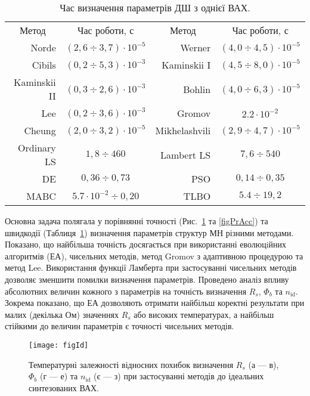 \documentclass[a5paper,10pt,twoside,openany,article]{memoir} %
\begin{document}
\begin{table}[b]
\caption{\label{tabRT}Час визначення параметрів ДШ з однієї ВАХ.}
\centering
\begin{tabular}{|r|c|r|c|}
\hline
\multicolumn{1}{|c|}{Метод}&Час роботи, с &\multicolumn{1}{c|}{Метод}&Час роботи, с\\ \hhline{|====|}
Norde &$(2,6\div3,7)\cdot10^{-5}$& Werner  &$(4,0\div4,5)\cdot10^{-5}$\\ \hline
Cibils  &$(0,2\div5,3)\cdot10^{-3}$& Kaminskii I &$(4,5\div8,0)\cdot10^{-5}$\\ \hline
Kaminskii II &$(0,3\div2,6)\cdot10^{-3}$& Bohlin &$(4,0\div6,3)\cdot10^{-5}$\\ \hline
Lee &$(0,2\div3,6)\cdot10^{-3}$& Gromov &$2.2\cdot10^{-2}$\\ \hline
Cheung &$(2,0\div3,2)\cdot10^{-5}$&Mikhelashvili &$(2,9\div4,7)\cdot10^{-5}$\\ \hline
Ordinary LS &$1,8\div460$&Lambert LS &$7,6\div540$\\ \hline
DE &$0,36\div0,73$&PSO &$0,14\div0,35$\\ \hline
MABC &$5.7\cdot10^{-2}\div0,20$&TLBO &$5.4\div19,2$ \\
\hline
\end{tabular}
\end{table}

Основна задача полягала у порівнянні точності (Рис.~\ref{figId} та \ref{figPrAcc}) та швидкодії (Таблиця~\ref{tabRT}) визначення параметрів структур МН різними методами.
Показано, що найбільша точність досягається при використанні еволюцiйних алгоритмів (ЕА), чисельних методів, метод Gromov з адаптивною процедурою та метод Lee.
Використання функції Ламберта при застосуванні чисельних методів дозволяє зменшити помилки визначення параметрів.
Проведено аналіз впливу абсолютних величин кожного з параметрів на точність визначення $R_s$, $\Phi_b$ та $n_\mathrm{id}$.
Зокрема показано, що ЕА дозволяють отримати найбільш коректні результати при малих (декілька Ом) значеннях $R_s$ або високих температурах, а найбільш стійкими до величин параметрів є точності чисельних методів.


\begin{figure}
\center
\texttt{[image: figId]}%
\caption{\label{figId}
Температурні залежності відносних похибок визначення $R_s$ (а --- в), $\Phi_b$ (г --- е) та $n_\mathrm{id}$ (є --- з) при застосуванні методів до ідеальних синтезованих ВАХ.
}
\end{figure}
\end{document}
